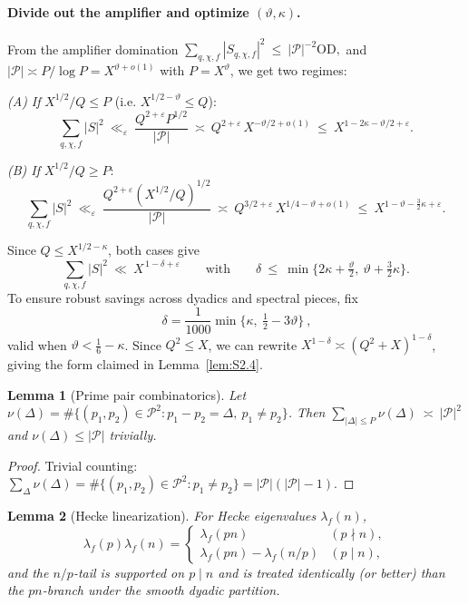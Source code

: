 \documentclass[11pt]{article}
\newtheorem{lemma}{Lemma}[part]
\theoremstyle{definition}
\theoremstyle{remark}
\numberwithin{equation}{part}
\begin{document}
\paragraph{Divide out the amplifier and optimize $(\vartheta,\kappa)$.}
From the amplifier domination
\(
\sum_{q,\chi,f}|S_{q,\chi,f}|^2\ \le\ |\mathcal P|^{-2}\mathrm{OD},
\)
and $|\mathcal P|\asymp P/\log P=X^{\vartheta+o(1)}$ with $P=X^\vartheta$, we get two regimes:

\smallskip
\noindent\emph{(A) If } $X^{1/2}/Q\le P$ (i.e. $X^{1/2-\vartheta}\le Q$):
\[
	\sum_{q,\chi,f}|S|^2\ \ll_\varepsilon\ \frac{Q^{2+\varepsilon}P^{1/2}}{|\mathcal P|}\ \asymp\ Q^{2+\varepsilon}\,X^{-\vartheta/2+o(1)}
	\ \le\ X^{1-2\kappa-\vartheta/2+\varepsilon}.
\]

\noindent\emph{(B) If } $X^{1/2}/Q\ge P$:
\[
	\sum_{q,\chi,f}|S|^2\ \ll_\varepsilon\ \frac{Q^{2+\varepsilon}(X^{1/2}/Q)^{1/2}}{|\mathcal P|}
	\ \asymp\ Q^{3/2+\varepsilon}\,X^{1/4-\vartheta+o(1)}
	\ \le\ X^{1-\vartheta-\tfrac{3}{2}\kappa+\varepsilon}.
\]

Since $Q\le X^{1/2-\kappa}$, both cases give
\[
	\sum_{q,\chi,f}|S|^2\ \ll\ X^{\,1-\delta+\varepsilon}
	\qquad\text{with}\qquad
	\delta\ \le\ \min\Big\{2\kappa+\tfrac{\vartheta}{2},\ \vartheta+\tfrac{3}{2}\kappa\Big\}.
\]
To ensure robust savings across dyadics and spectral pieces, fix
\[
	\boxed{\ \delta=\frac{1}{1000}\min\!\Big\{\kappa,\ \tfrac12-3\vartheta\Big\}\ },
\]
valid when $\vartheta<\tfrac16-\kappa$. Since $Q^2\le X$, we can rewrite $X^{1-\delta}\asymp(Q^2+X)^{1-\delta}$, giving the form claimed in Lemma~\ref{lem:S2.4}.


\begin{lemma}[Prime pair combinatorics]\label{lem:prime-pair}
	Let $\nu(\Delta)=\#\{(p_1,p_2)\in\mathcal P^2: p_1-p_2=\Delta,\ p_1\ne p_2\}$. Then
	\(
	\sum_{|\Delta|\le P}\nu(\Delta)\ \asymp\ |\mathcal P|^2
	\)
	and $\nu(\Delta)\le |\mathcal P|$ trivially.
\end{lemma}

\begin{proof}
	Trivial counting: $\sum_{\Delta}\nu(\Delta)=\#\{(p_1,p_2)\in\mathcal P^2: p_1\ne p_2\}=|\mathcal P|(|\mathcal P|-1)$.
\end{proof}

\begin{lemma}[Hecke linearization]\label{lem:hecke-linearization}
	For Hecke eigenvalues $\lambda_f(n)$,
	\[
		\lambda_f(p)\lambda_f(n)=
		\begin{cases}
			\lambda_f(pn)                & (p\nmid n), \\
			\lambda_f(pn)-\lambda_f(n/p) & (p\mid n),
		\end{cases}
	\]
	and the $n/p$-tail is supported on $p\mid n$ and is treated identically (or better) than the $pn$-branch under the smooth dyadic partition.
\end{lemma}
\end{document}
